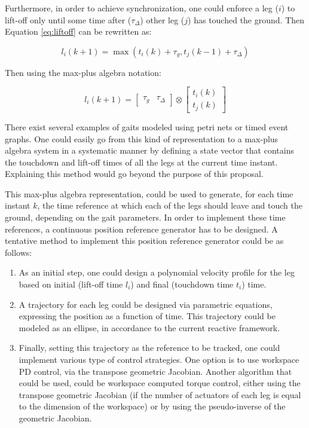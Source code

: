 \documentclass[main.tex]{subfiles}
\begin{document}
	Furthermore, in order to achieve synchronization, one could enforce a leg ($i$) to lift-off only until some time after ($\tau_\Delta$) other leg ($j$) has touched the ground. Then Equation \eqref{eq:liftoff} can be rewritten as:
	
	\begin{equation}
		l_i (k+1) = \max (t_i (k) + \tau_g , t_j (k-1) + \tau_\Delta)\label{eq:liftoffsync}
	\end{equation}
	
	Then using the max-plus algebra notation:
	
	\begin{equation}
		l_i (k+1) =\begin{bmatrix}
		\tau_g & \tau_\Delta
		\end{bmatrix} \otimes \begin{bmatrix}
		t_i (k) \\
		t_j (k)
		\end{bmatrix}
	\end{equation}
	
	There exist several examples of gaits modeled using petri nets or timed event graphs. One could easily go from this kind of representation to a max-plus algebra system in a systematic manner \cite{Schutter2009} by defining a state vector that contains the touchdown and lift-off times of all the legs at the current time instant. Explaining this method would go beyond the purpose of this proposal. 
	
	This max-plus algebra representation, could be used to generate, for each time instant $k$, the time reference at which each of the legs should leave and touch the ground, depending on the gait parameters. In order to implement these time references, a continuous position reference generator has to be designed. A tentative method to implement this position reference generator could be as follows:
	
	\begin{enumerate}
		\item As an initial step, one could design a polynomial velocity profile for the leg based on initial (lift-off time $l_i$) and final (touchdown time $t_i$) time.
		\item A trajectory for each leg could be designed via parametric equations, expressing the position as a function of time. This trajectory could be modeled as an ellipse, in accordance to the current reactive framework. 
		\item Finally, setting this trajectory as the reference to be tracked, one could implement various type of control strategies. One option is to use workspace PD control, via the transpose geometric Jacobian. Another algorithm that could be used, could be workspace computed torque control, either using the transpose geometric Jacobian (if the number of actuators of each leg is equal to the dimension of the workspace) or by using the pseudo-inverse of the geometric Jacobian.
	\end{enumerate}
	
\end{document}
